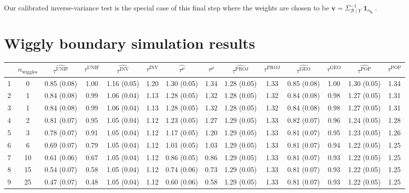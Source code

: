 \documentclass[letter]{article}
\DeclareMathOperator{\ones}{\mathbf{1}}
\newcommand{\vvec}{\mathbold{v}}
\newcommand{\boundary}{\mathcal{B}}
\newcommand{\sentinels}{\bm{b}}
\newcommand{\unifavg}{\tau^{\mathrm{UNIF}}}
\newcommand{\invvar}{\tau^{\mathrm{INV}}}
\newcommand{\taurho}{\tau^{\rho}}
\newcommand{\tauproj}{\tau^{\mathrm{PROJ}}}
\newcommand{\taugeo}{\tau^{\mathrm{GEO}}}
\newcommand{\taupop}{\tau^{\mathrm{POP}}}
\newcommand{\numsent}{n_{\sentinels}}
\begin{document}
Our calibrated inverse-variance test is the special case of this final step where the weights are chosen to be \(\vvec = \Sigma^{-1}_{\boundary \mid Y} \ones_{\numsent}\).
    


    	\section{Wiggly boundary simulation results}\label{wiggly-boundary-simulation-results}
    

\begin{landscape}

\begin{table}
\begin{tabular}{r|ccccccccccccc}
	& $n_{\mathrm{wiggles}}$ & $\widehat{\unifavg}$ & $\unifavg$ & $\widehat{\invvar}$ & $\invvar$ & $\widehat{\taurho}$ & $\taurho$ & $\widehat{\tauproj}$ & $\tauproj$ & $\widehat{\taugeo}$ & $\taugeo$ & $\widehat{\taupop}$ & $\taupop$\\
		\hline
		1 & 0 & 0.85 (0.08) & 1.00 & 1.16 (0.05) & 1.20 & 1.30 (0.05) & 1.34 & 1.28 (0.05) & 1.33 & 0.85 (0.08) & 1.00 & 1.30 (0.05) & 1.34 \\
		2 & 1 & 0.84 (0.08) & 0.99 & 1.06 (0.04) & 1.13 & 1.28 (0.05) & 1.32 & 1.28 (0.05) & 1.32 & 0.84 (0.08) & 0.98 & 1.27 (0.05) & 1.31 \\
		3 & 1 & 0.84 (0.08) & 0.99 & 1.06 (0.04) & 1.13 & 1.28 (0.05) & 1.32 & 1.28 (0.05) & 1.32 & 0.84 (0.08) & 0.98 & 1.27 (0.05) & 1.31 \\
		4 & 2 & 0.81 (0.07) & 0.95 & 1.05 (0.04) & 1.12 & 1.23 (0.05) & 1.27 & 1.29 (0.05) & 1.33 & 0.82 (0.07) & 0.96 & 1.24 (0.05) & 1.28 \\
		5 & 3 & 0.78 (0.07) & 0.91 & 1.05 (0.04) & 1.12 & 1.17 (0.05) & 1.20 & 1.29 (0.05) & 1.33 & 0.81 (0.07) & 0.95 & 1.23 (0.05) & 1.26 \\
		6 & 6 & 0.69 (0.07) & 0.79 & 1.05 (0.04) & 1.12 & 1.01 (0.05) & 1.03 & 1.29 (0.05) & 1.33 & 0.81 (0.07) & 0.94 & 1.22 (0.05) & 1.25 \\
		7 & 10 & 0.61 (0.06) & 0.67 & 1.05 (0.04) & 1.12 & 0.86 (0.05) & 0.86 & 1.29 (0.05) & 1.33 & 0.81 (0.07) & 0.93 & 1.22 (0.05) & 1.25 \\
		8 & 15 & 0.54 (0.07) & 0.58 & 1.05 (0.04) & 1.12 & 0.74 (0.06) & 0.73 & 1.29 (0.05) & 1.33 & 0.81 (0.07) & 0.93 & 1.22 (0.05) & 1.25 \\
		9 & 25 & 0.47 (0.07) & 0.48 & 1.05 (0.04) & 1.12 & 0.60 (0.06) & 0.58 & 1.29 (0.05) & 1.33 & 0.81 (0.07) & 0.93 & 1.22 (0.05) & 1.25 \\

\end{tabular}
\end{table}
\end{landscape}
\end{document}
